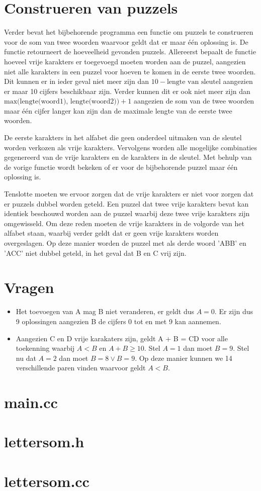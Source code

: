 \documentclass{article}
\begin{document}
\section{Construeren van puzzels}

Verder bevat het bijbehorende programma een functie om puzzels te construeren voor de som van twee woorden waarvoor geldt dat er maar \'e\'en oplossing is. De functie retourneert de hoeveelheid gevonden puzzels. Allereerst bepaalt de functie hoeveel vrije karakters er toegevoegd moeten worden aan de puzzel, aangezien niet alle karakters in een puzzel voor hoeven te komen in de eerste twee woorden. Dit kunnen er in ieder geval niet meer zijn dan $10 - \text{lengte van sleutel}$ aangezien er maar 10 cijfers beschikbaar zijn. Verder kunnen dit er ook niet meer zijn dan $\text{max(lengte(woord1), lengte(woord2))} + 1$ aangezien de som van de twee woorden maar \'e\'en cijfer langer kan zijn dan de maximale lengte van de eerste twee woorden.

De eerste karakters in het alfabet die geen onderdeel uitmaken van de sleutel worden verkozen als vrije karakters. Vervolgens worden alle mogelijke combinaties gegenereerd van de vrije karakters en de karakters in de sleutel. Met behulp van de vorige functie wordt bekeken of er voor de bijbehorende puzzel maar \'e\'en oplossing is.

Tenslotte moeten we ervoor zorgen dat de vrije karakters er niet voor zorgen dat er puzzels dubbel worden geteld. Een puzzel dat twee vrije karakters bevat kan identiek beschouwd worden aan de puzzel waarbij deze twee vrije karakters zijn omgewisseld. Om deze reden moeten de vrije karakters in de volgorde van het alfabet staan, waarbij verder geldt dat er geen vrije karakters worden overgeslagen. Op deze manier worden de puzzel met als derde woord 'ABB' en 'ACC' niet dubbel geteld, in het geval dat B en C vrij zijn.

\section{Vragen}

\begin{itemize}
  \item Het toevoegen van A mag B niet veranderen, er geldt dus $A = 0$. Er zijn dus 9 oplossingen aangezien B de cijfers 0 tot en met 9 kan aannemen.
  \item Aangezien C en D vrije karakaters zijn, geldt A + B = CD voor alle toekenning waarbij $A < B$ en $A + B \ge 10$. Stel $A = 1$ dan moet $B = 9$. Stel nu dat $A = 2$ dan moet $B = 8 \lor B = 9$. Op deze manier kunnen we 14 verschillende paren vinden waarvoor geldt $A < B$.
\end{itemize}

\section{main.cc}



\section{lettersom.h}



\section{lettersom.cc}


\end{document}
